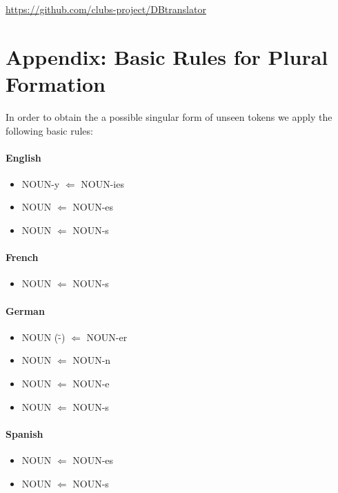\documentclass[a4paper,11pt]{article}
\begin{document}
	\url{https://github.com/clubs-project/DBtranslator}
	
	
	
	
	
	
	\appendix
	\section{Appendix: Basic Rules for Plural Formation}
	\label{ap:plural}
	
	In order to obtain the a possible singular form of unseen tokens we apply the following basic rules:
	
	\renewcommand{\labelitemi}{$\star$}
	\paragraph{English}
	\begin{itemize}
		\itemsep-0.2em 
		\item NOUN-y $\Leftarrow$ NOUN-ies
		\item NOUN $\Leftarrow$ NOUN-es
		\item NOUN $\Leftarrow$ NOUN-s
	\end{itemize}
	
	\paragraph{French}
	\begin{itemize}
		\itemsep-0.2em 
		\item NOUN $\Leftarrow$ NOUN-s
	\end{itemize}
	
	\paragraph{German}
	\begin{itemize}
		\itemsep-0.2em 
		\item NOUN (\"-) $\Leftarrow$ NOUN-er
		\item NOUN $\Leftarrow$ NOUN-n
		\item NOUN $\Leftarrow$ NOUN-e
		\item NOUN $\Leftarrow$ NOUN-s
	\end{itemize}
	
	\paragraph{Spanish}
	\begin{itemize}
		\itemsep-0.2em 
		\item NOUN $\Leftarrow$ NOUN-es
		\item NOUN $\Leftarrow$ NOUN-s
	\end{itemize}
	
\end{document}
